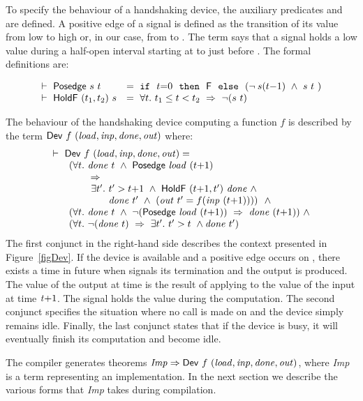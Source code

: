 To specify the behaviour of a handshaking device,
the auxiliary predicates  and  are defined.
A positive edge of a signal is defined as the transition of its
value from low to high or, in our case, from  to . 
The term  says that a
signal  holds a low value  during a half-open interval
starting at  to just before . The formal definitions are:

\vspace*{-1mm}

\[
\begin{array}{ll}
\vdash\ \mathsf{Posedge}\ s\ t~ &      = ~ \texttt{if}~~t{=}0~~\texttt{then}~~\mathsf{F}~~\texttt{else}~~(\neg\hspace*{0.8mm} s(t{-}1)\ \wedge\ s\ t~)\\
\vdash\ \mathsf{HoldF}\ (t_1,t_2)\ s & = ~ \forall t.\ t_1 \leq t < t_2\ \Rightarrow\ \neg(s\ t)
\end{array}
\]



The behaviour of the handshaking device computing a function $f$ is described by the term 
$\DEF{Dev}\ f\ \VAR{(load,inp,done,out)}$ where:
\[
\begin{array}{l}
\TURNST\ \DEF{Dev}\ f\ \VAR{(load,inp,done,out)} = \\
~~\quad     (\forall t.\ \VAR{done}\ t\ \AND\ \DEF{Posedge}\ \VAR{load}\ (t{+}1)\ \\
\phantom{~~\quad     (\forall t.~} \IMP \\
\phantom{~~\quad     (\forall t.\ ~ } \exists t'.\ t' > t{+}1\ \AND\ \DEF{HoldF}\ (t{+}1,t')\ \VAR{done}\ \AND \\
\phantom{~~\quad     (\forall t.\ ~ \exists t'.\ }  \VAR{done}\ t'\ \AND\ (\VAR{out}\ t' = f (\VAR{inp}\ (t{+}1))))\ ~  \AND \\
~~\quad (\forall t.\ \VAR{done}\ t\ \AND\ \NOT(\DEF{Posedge}\ \VAR{load}\ (t{+}1))\ \IMP\  \VAR{done}\ (t{+}1)) ~\AND \\
~~\quad (\forall t.\ \NOT(\VAR{done}\ t)\ \IMP\ \exists t'.\ t' > t\ \AND \VAR{done}\ t')\\
\end{array}
\]
The first conjunct in the right-hand side describes the context presented
in Figure~\ref{figDev}. If the device is available and a positive
edge occurs on , there exists a time  in future
when  signals its termination and the output is produced.
The value of the output at time  is the result
of applying  to the value of the input at time $\mathit{t}{+}1$.
The signal  holds the value  during the computation.
The second conjunct specifies the situation where no call
is made on  and the device simply remains idle.
Finally, the last conjunct states that if the device
is busy, it will eventually finish its computation
and become idle.

The compiler generates theorems ${\it{Imp}}
\Rightarrow \mathsf{Dev}\ f\ \mathit{(load,inp,done,out)}$, where {\it{Imp}}
is a term representing an implementation. In the next section we
describe the various forms that {\it{Imp}} takes during compilation.
